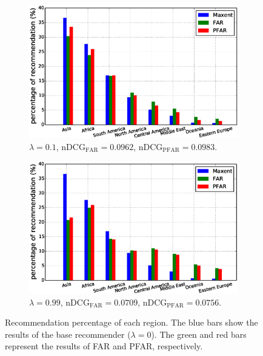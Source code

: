 \begin{figure}
\centering
\begin{subfigure}{0.495\columnwidth}
\includegraphics[width=\textwidth]{imgs/far/maxent-lambda01.png}
\caption{$\lambda=0.1$, $\text{nDCG}_{\text{FAR}}=0.0962$,\;\;\;\;\;\; $\text{nDCG}_{\text{PFAR}}=0.0983$. \label{subfig:lambda01}}
\end{subfigure}
\begin{subfigure}{0.495\columnwidth}
\includegraphics[width=\textwidth]{imgs/far/maxent-lambda10.png}
\caption{$\lambda=0.99$,  $\text{nDCG}_{\text{FAR}}=0.0709$,\;\;\;\;\; $\text{nDCG}_{\text{PFAR}}=0.0756$.\label{subfig:lambda10}}
\end{subfigure}
\caption{Recommendation percentage of each region. The blue bars show the results of the base recommender ($\lambda=0$). The green and red bars represent the results of FAR and PFAR, respectively.\label{fig:kiva_num_rec}}
\end{figure}


